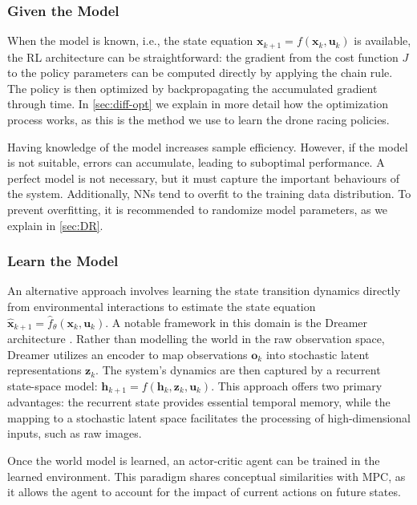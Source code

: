 \subsubsection{Given the Model}
When the model is known, i.e., the state equation $\mathbf{x}_{k+1} = f(\mathbf{x}_{k}, \mathbf{u}_{k})$ is available, the \ac{RL} architecture can be straightforward: the gradient from the cost function $J$ to the policy parameters can be computed directly by applying the chain rule.
The policy is then optimized by backpropagating the accumulated gradient through time.
In \autoref{sec:diff-opt} we explain in more detail how the optimization process works, as this is the method we use to learn the drone racing policies.

Having knowledge of the model increases sample efficiency.
However, if the model is not suitable, errors can accumulate, leading to suboptimal performance.
A perfect model is not necessary, but it must capture the important behaviours of the system.
Additionally, \ac{NN}s tend to overfit to the training data distribution.
To prevent overfitting, it is recommended to randomize model parameters, as we explain in \autoref{sec:DR}.
\subsubsection{Learn the Model}
An alternative approach involves learning the state transition dynamics directly from environmental interactions to estimate the state equation $\hat{\mathbf{x}}_{k+1} = \hat{f}_\theta(\mathbf{x}_k, \mathbf{u}_k)$.
A notable framework in this domain is the Dreamer architecture \cite{hafner_mastering_2024}.
Rather than modelling the world in the raw observation space, Dreamer utilizes an encoder to map observations $\mathbf{o}_k$ into stochastic latent representations $\mathbf{z}_k$.
The system's dynamics are then captured by a recurrent state-space model: $\mathbf{h}_{k+1} = f(\mathbf{h}_k, \mathbf{z}_k, \mathbf{u}_k)$.
This approach offers two primary advantages: the recurrent state provides essential temporal memory, while the mapping to a stochastic latent space facilitates the processing of high-dimensional inputs, such as raw images.

Once the world model is learned, an actor-critic agent can be trained in the learned environment.
This paradigm shares conceptual similarities with \ac{MPC}, as it allows the agent to account for the impact of current actions on future states.

\newpage

